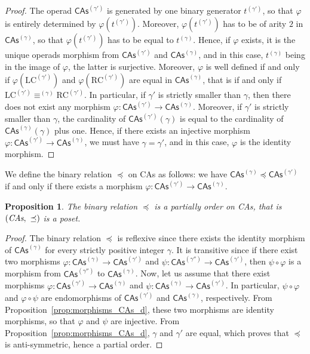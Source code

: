 \documentclass[10pt,reqno]{amsart}
\numberwithin{equation}{subsection}
\newtheorem{Proposition}[Theorem]{Proposition}
\newcommand{\CAs}[1]{\mathsf{CAs}^{(#1)}}
\newcommand{\LC}[1]{\text{LC}^{(#1)}}
\newcommand{\RC}[1]{\text{RC}^{(#1)}}
\DeclareMathOperator{\Congr}{\equiv}
\newcommand{\CongrCAs}[1]{\Congr^{(#1)}}
\begin{document}
\begin{proof}
  The operad $\CAs{\gamma'}$ is generated by one binary generator $t^{(\gamma')}$, so that
  $\varphi$ is entirely determined by $\varphi\left(t^{(\gamma')}\right)$. Moreover,
  $\varphi\left(t^{(\gamma')}\right)$ has to be of arity $2$ in $\CAs{\gamma}$, so that
  $\varphi\left(t^{(\gamma')}\right)$ has to be equal to $t^{(\gamma)}$. Hence, if $\varphi$
  exists, it is the unique operads morphism from $\CAs{\gamma'}$ and $\CAs{\gamma}$,
  and in this case, $t^{(\gamma)}$ being in the image of $\varphi$, the latter is
  surjective. Moreover, $\varphi$ is well defined if and only if
  $\varphi\left(\LC{\gamma'}\right)$ and $\varphi\left(\RC{\gamma'}\right)$ are equal in
  $\CAs{\gamma}$, that is if and only if $\LC{\gamma'}\CongrCAs{\gamma}\RC{\gamma'}$. In particular,
  if $\gamma'$ is strictly smaller than $\gamma$, then there does not exist any morphism
  $\varphi:\CAs{\gamma'}\to\CAs{\gamma}$. Moreover, if $\gamma'$ is strictly smaller
  than $\gamma$, the cardinality of $\CAs{\gamma'}\left(\gamma\right)$ is equal to the cardinality
  of $\CAs{\gamma}(\gamma)$ plus one. Hence, if there exists an injective morphism
  $\varphi:\CAs{\gamma'}\to\CAs{\gamma}$, we must have $\gamma=\gamma'$, and in this case,
  $\varphi$ is the identity morphism.
\end{proof}

We define the binary relation $\preceq$ on CAs as follows: we have $\CAs{\gamma}\preceq\CAs{\gamma'}$
if and only if there exists a morphism $\varphi:\CAs{\gamma'}\to\CAs{\gamma}$.

\begin{Proposition}\label{prop:poset_CAs}
  The binary relation $\preceq$ is a partially order on \emph{CAs}, that is
  $\left(\emph{CAs},\ \preceq\right)$ is a poset.
  \end{Proposition}

\begin{proof}
  The binary relation $\preceq$ is reflexive since there exists the identity morphism
  of $\CAs{\gamma}$ for every strictly positive integer $\gamma$. It is transitive since if
  there exist two morphisms  $\varphi:\CAs{\gamma}\to\CAs{\gamma'}$ and
  $\psi:\CAs{\gamma''}\to\CAs{\gamma'}$, then $\psi\circ\varphi$ is a morphism from
  $\CAs{\gamma''}$ to $\CAs{\gamma}$. Now, let us assume that there exist morphisms
  $\varphi:\CAs{\gamma'}\to\CAs{\gamma}$ and $\psi:\CAs{\gamma}\to\CAs{\gamma'}$.
  In particular, $\psi\circ\varphi$ and $\varphi\circ\psi$ are endomorphisms of $\CAs{\gamma'}$
  and $\CAs{\gamma}$, respectively. From Proposition~\ref{prop:morphisms_CAs_d}, these two
  morphisms are identity morphisms, so that $\varphi$ and $\psi$ are injective. From
  Proposition~\ref{prop:morphisms_CAs_d}, $\gamma$ and $\gamma'$ are equal, which proves that
  $\preceq$ is anti-symmetric, hence a partial order.
  \end{proof}
\end{document}
